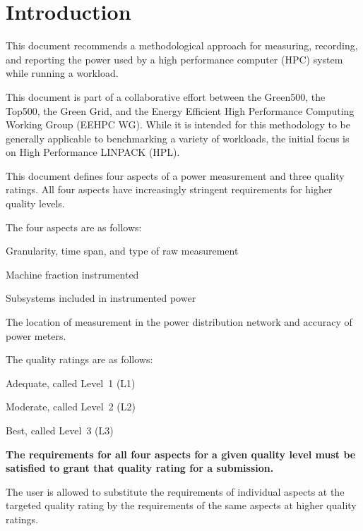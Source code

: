 \chapter{Introduction}
\label{sec:intro}

\noindent
This document recommends a methodological approach for measuring, recording, and reporting the power used by a high performance computer (HPC) system while running a workload.
\wl

\noindent
This document is part of a collaborative effort between the Green500, the Top500, the Green Grid, and the Energy Efficient High Performance Computing Working Group (EEHPC WG).
While it is intended for this methodology to be generally applicable to benchmarking a variety of workloads, the initial focus is on High Performance LINPACK (HPL).
\wl

\noindent
This document defines four aspects of a power measurement and three quality ratings.
All four aspects have increasingly stringent requirements for higher quality levels. 
\wl

\noindent
The four aspects are as follows:

\begin{packed_enum}
\item 
Granularity, time span, and type of raw measurement
\item 
Machine fraction instrumented
\item 
Subsystems included in instrumented power
\item 
The location of measurement in the power distribution network and accuracy of power meters.
\end{packed_enum}

\noindent
The quality ratings are as follows:

\begin{packed_item}
\item 
Adequate, called Level~1 (L1)
\item
Moderate, called Level~2 (L2)
\item
Best, called Level~3 (L3)
\end{packed_item}

\noindent
\textbf{The requirements for all four aspects for a given quality level must be satisfied to grant that quality rating for a submission.}
\wl

\noindent
The user is allowed to substitute the requirements of individual aspects at the targeted quality rating by the requirements of the same aspects at higher quality ratings.
\wl
